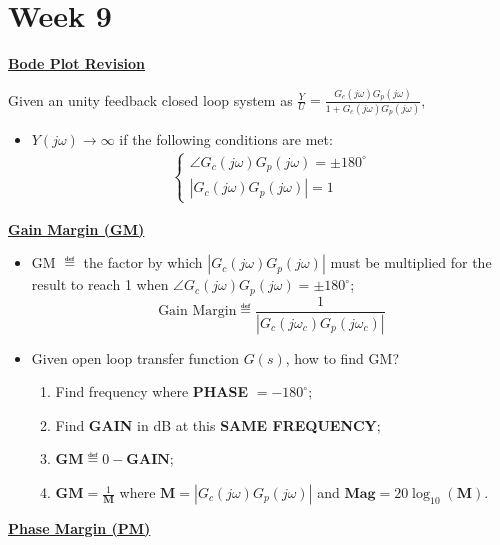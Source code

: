 \section{Week 9}

\textbf{\large \underline{Bode Plot Revision}}

Given an unity feedback closed loop system as $\frac{Y}{U}=\frac{G_c(j\omega)G_p(j\omega)}{1+G_c(j\omega)G_p(j\omega)}$,
\begin{itemize}
    \item $Y(j\omega)\to \infty$ if the following conditions are met:
    \begin{align*}
        \begin{cases}
            \angle G_c(j\omega)G_p(j\omega)=\pm 180^{\circ} \\
            |G_c(j\omega)G_p(j\omega)|=1
        \end{cases}
    \end{align*}
\end{itemize}
\textbf{\large \underline{Gain Margin (GM)}} 
\begin{itemize}
    \item GM $\eqdef$ the factor by which $|G_c(j\omega)G_p(j\omega)|$ must be multiplied for the result to reach 1 when $\angle G_c(j\omega)G_p(j\omega)=\pm 180^{\circ}$;
    \begin{equation*}
        \text{Gain Margin}\eqdef \frac{1}{|G_c(j\omega_c)G_p(j\omega_c)|}
    \end{equation*}
    \item Given open loop transfer function $G(s)$, how to find GM?
    \begin{enumerate}
        \item Find frequency where \textbf{PHASE} $=-180^{\circ}$;
        \item Find \textbf{GAIN} in dB at this \textbf{SAME FREQUENCY};
        \item $\textbf{GM} \eqdef 0 - \textbf{GAIN}$;
        \item $\textbf{GM}=\frac{1}{\bm{M}}$ where $\bm{M}=|G_c(j\omega)G_p(j\omega)|$ and $\textbf{Mag}=20\log_{10}(\bm{M})$.
    \end{enumerate}
\end{itemize}
\textbf{\large \underline{Phase Margin (PM)}} 
